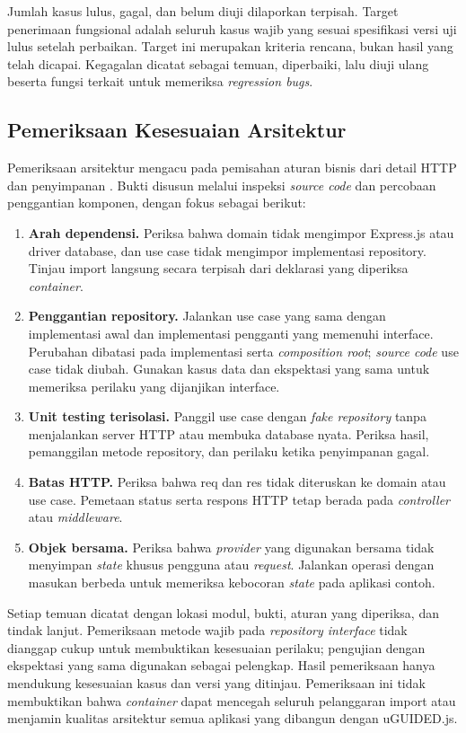 \documentclass[12pt,a4paper,oneside]{report}
\begin{document}
Jumlah kasus lulus, gagal, dan belum diuji dilaporkan terpisah. Target penerimaan fungsional adalah seluruh kasus wajib yang sesuai spesifikasi versi uji lulus setelah perbaikan. Target ini merupakan kriteria rencana, bukan hasil yang telah dicapai. Kegagalan dicatat sebagai temuan, diperbaiki, lalu diuji ulang beserta fungsi terkait untuk memeriksa \textit{regression bugs}.

\subsection{Pemeriksaan Kesesuaian Arsitektur}
Pemeriksaan arsitektur mengacu pada pemisahan aturan bisnis dari detail HTTP dan penyimpanan \cite{martin2017clean}. Bukti disusun melalui inspeksi \textit{source code} dan percobaan penggantian komponen, dengan fokus sebagai berikut:
\begin{enumerate}
\item \textbf{Arah dependensi.} Periksa bahwa domain tidak mengimpor Express.js atau driver database, dan use case tidak mengimpor implementasi repository. Tinjau import langsung secara terpisah dari deklarasi yang diperiksa \textit{container}.
\item \textbf{Penggantian repository.} Jalankan use case yang sama dengan implementasi awal dan implementasi pengganti yang memenuhi interface. Perubahan dibatasi pada implementasi serta \textit{composition root}; \textit{source code} use case tidak diubah. Gunakan kasus data dan ekspektasi yang sama untuk memeriksa perilaku yang dijanjikan interface.
\item \textbf{Unit testing terisolasi.} Panggil use case dengan \textit{fake repository} tanpa menjalankan server HTTP atau membuka database nyata. Periksa hasil, pemanggilan metode repository, dan perilaku ketika penyimpanan gagal.
\item \textbf{Batas HTTP.} Periksa bahwa req dan res tidak diteruskan ke domain atau use case. Pemetaan status serta respons HTTP tetap berada pada \textit{controller} atau \textit{middleware}.
\item \textbf{Objek bersama.} Periksa bahwa \textit{provider} yang digunakan bersama tidak menyimpan \textit{state} khusus pengguna atau \textit{request}. Jalankan operasi dengan masukan berbeda untuk memeriksa kebocoran \textit{state} pada aplikasi contoh.
\end{enumerate}
Setiap temuan dicatat dengan lokasi modul, bukti, aturan yang diperiksa, dan tindak lanjut. Pemeriksaan metode wajib pada \textit{repository interface} tidak dianggap cukup untuk membuktikan kesesuaian perilaku; pengujian dengan ekspektasi yang sama digunakan sebagai pelengkap. Hasil pemeriksaan hanya mendukung kesesuaian kasus dan versi yang ditinjau. Pemeriksaan ini tidak membuktikan bahwa \textit{container} dapat mencegah seluruh pelanggaran import atau menjamin kualitas arsitektur semua aplikasi yang dibangun dengan uGUIDED.js.
\end{document}
